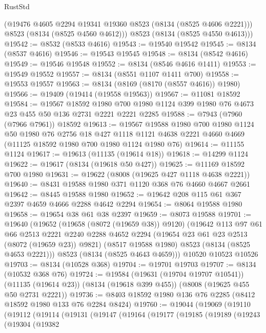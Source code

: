 \begin{lexlean}{RustStd}
\begin{coremodule}
{\begin{coremodule}
{{{{{{{{{{{{{{{{{{{{{{{{{{{{{{{{{{{{{{{{{{{{{{{{{{{{{        (@19476 @4605 @2294 @19341 @19360 @8523 (@8134 (@8525 @4606 @2221)))
        @8523
        (@8134 (@8525 @4560 @4612)))
      @8523
      (@8134 (@8525 @4550 @4613)))
@19542 := @8532 (@8533 @4616)
@19543 := @19540 @19542
@19545 := @8134 (@8537 @4616)
@19546 := @19543 @19545
@19548 := @8134 (@8542 @4616)
@19549 := @19546 @19548
@19552 := @8134 (@8546 @4616 @1411)
@19553 := @19549 @19552
@19557 := @8134 (@8551 @1107 @1411 @700)
@19558 := @19553 @19557
@19563 := @8134 (@8169 (@8170 (@8557 @4616)) @1980)
@19566 := @19409 (@19414 (@19558 @19563))
@19567 := @11081 @18592
@19584 := @19567
    @18592
    @1980
    @700
    @1980
    @1124
    @399
    @1980
    @76
    @4673
    @23
    @455
    @50
    @136
    @2731
    @2221
    @2221
    @2285
@19588 := @7943 (@7960 (@7966 @7961)) @18592
@19613 := @19567
    @19588
    @1980
    @700
    @1980
    @1124
    @50
    @1980
    @76
    @2756
    @18
    @427
    @1118
    @1121
    @4638
    @2221
    @4660
    @4669
    (@11125 @18592 @1980 @700 @1980 @1124 @1980 @76)
@19614 := @11155 @1124
@19617 := @19613 (@11135 (@19614 @18))
@19618 := @14299 @1124
@19622 := @19617 (@8134 (@19618 @50 @427))
@19625 := @11169 @18592 @700 @1980
@19631 := @19622 (@8008 (@19625 @427 @1118 @4638 @2221))
@19640 := @8431 @19588 @1980 @371 @1120 @368 @76 @4660 @4667 @2661
@19642 := @8445 @19588 @1980
@19652 := @19642 @208 @115 @61 @367 @2397 @4659 @4666 @2288 @4642 @2294
@19654 := @8064 @19588 @1980
@19658 := @19654 @38 @61 @38 @2397
@19659 := @8073 @19588
@19701 := @19640
    (@19652
      (@19658 (@8072 (@19659 @38)) @9120)
      (@19642
        @113
        @97
        @61
        @66
        @2513
        @2221
        @2240
        @2288
        @4652
        @2294
        (@19654 @23 @61 @23 @2513 (@8072 (@19659 @23)) @9821)
        (@8517 @19588 @1980)
        @8523
        (@8134 (@8525 @4653 @2221)))
      @8523
      (@8134 (@8525 @4643 @4659)))
    @10520
    @10523
    @10526
@19703 := @8134 (@10528 @368)
@19704 := @19701 @19703
@19707 := @8134 (@10532 @368 @76)
@19724 := @19584
    (@19631 (@19704 @19707 @10541))
    (@11135 (@19614 @23))
    (@8134 (@19618 @399 @455))
    (@8008 (@19625 @455 @50 @2731 @2221))
@19736 := @8403 @18592 @1980 @136 @76 @2285 (@8412 @18592 @1980 @133 @76 @2284 @8424)
@19760 := @19044
    (@19069
      (@19110
        (@19112
          (@19114
            (@19131
              (@19147
                (@19164
                  (@19177
                    (@19185
                      (@19189
                        (@19243
                          (@19304
                            (@19382
}}}}}}}}}}}}}}}}}}}}}}}}}}}}}}}}}}}}}}}}}}}}}}}}}}}}}
\end{coremodule}}
\end{coremodule}
\end{lexlean}
